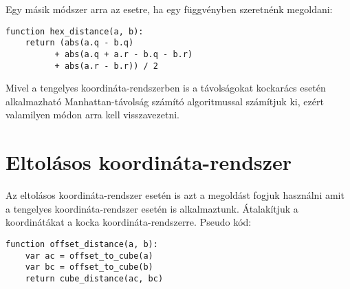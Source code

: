 \noindent Egy másik módszer arra az esetre, ha egy függvényben szeretnénk megoldani:
\begin{verbatim} 
function hex_distance(a, b):
    return (abs(a.q - b.q) 
          + abs(a.q + a.r - b.q - b.r)
          + abs(a.r - b.r)) / 2
\end{verbatim}          

\noindent Mivel a tengelyes koordináta-rendszerben is a távolságokat kockarács esetén alkalmazható Manhattan-távolság számító algoritmussal számítjuk ki, ezért valamilyen módon arra kell visszavezetni.

\section{Eltolásos koordináta-rendszer}

Az eltolásos koordináta-rendszer esetén is azt a megoldást fogjuk használni amit a tengelyes koordináta-rendszer esetén is alkalmaztunk. Átalakítjuk a koordinátákat a kocka koordináta-rendszerre.
\newline
\newline Pseudo kód:
\begin{verbatim} 
function offset_distance(a, b):
    var ac = offset_to_cube(a)
    var bc = offset_to_cube(b)
    return cube_distance(ac, bc)
\end{verbatim}  
